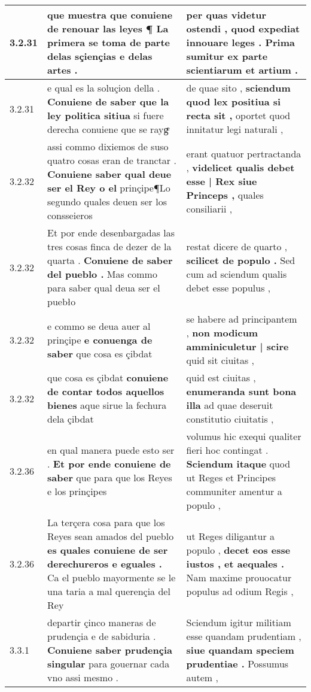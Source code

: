 \begin{tabular}{|p{1cm}|p{6.5cm}|p{6.5cm}|}
3.2.31 & que muestra \textbf{ que conuiene de renouar las leyes ¶ } La primera se toma de parte delas sçiençias e delas artes . & per quas videtur ostendi , \textbf{ quod expediat innouare leges . } Prima sumitur ex parte scientiarum et artium . \\\hline
3.2.31 & e qual es la soluçion della . \textbf{ Conuiene de saber que la ley politica sitiua } si fuere derecha conuiene que se raygͤ & de quae sito , \textbf{ sciendum quod lex positiua si recta sit , } oportet quod innitatur legi naturali , \\\hline
3.2.32 & assi commo dixiemos de suso quatro cosas eran de tranctar . \textbf{ Conuiene saber qual deue ser el Rey o el } prinçipe¶Lo segundo quales deuen ser los consseieros & erant quatuor pertractanda , \textbf{ videlicet qualis debet esse | Rex siue Princeps , } quales consiliarii , \\\hline
3.2.32 & Et por ende desenbargadas las tres cosas finca de dezer de la quarta . \textbf{ Conuiene de saber del pueblo . } Mas commo para saber qual deua ser el puebło & restat dicere de quarto , \textbf{ scilicet de populo . } Sed cum ad sciendum qualis debet esse populus , \\\hline
3.2.32 & e commo se deua auer al prinçipe \textbf{ e conuenga de saber } que cosa es çibdat & se habere ad principantem , \textbf{ non modicum amminiculetur | scire } quid sit ciuitas , \\\hline
3.2.32 & que cosa es çibdat \textbf{ conuiene de contar todos aquellos bienes } aque sirue la fechura dela çibdat & quid est ciuitas , \textbf{ enumeranda sunt bona illa } ad quae deseruit constitutio ciuitatis , \\\hline
3.2.36 & en qual manera puede esto ser . \textbf{ Et por ende conuiene de saber } que para que los Reyes e los prinçipes & volumus hic exequi qualiter fieri hoc contingat . \textbf{ Sciendum itaque } quod ut Reges et Principes communiter amentur a populo , \\\hline
3.2.36 & La terçera cosa para que los Reyes sean amados del pueblo \textbf{ es quales conuiene de ser derechureros e eguales . } Ca el pueblo mayormente se le una taria a mal querençia del Rey & ut Reges diligantur a populo , \textbf{ decet eos esse iustos , et aequales . } Nam maxime prouocatur populus ad odium Regis , \\\hline
3.3.1 & departir çinco maneras de prudençia e de sabiduria . \textbf{ Conuiene saber prudençia singular } para gouernar cada vno assi mesmo . & Sciendum igitur militiam esse quandam prudentiam , \textbf{ siue quandam speciem prudentiae . } Possumus autem , \\\hline

\end{tabular}

